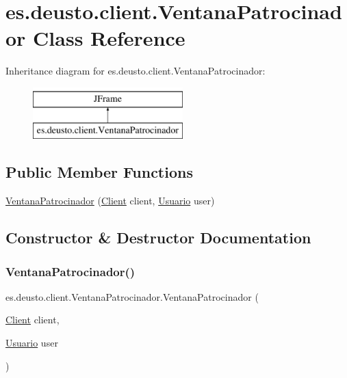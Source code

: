 \hypertarget{classes_1_1deusto_1_1client_1_1_ventana_patrocinador}{}\section{es.\+deusto.\+client.\+Ventana\+Patrocinador Class Reference}
\label{classes_1_1deusto_1_1client_1_1_ventana_patrocinador}
Inheritance diagram for es.\+deusto.\+client.\+Ventana\+Patrocinador\+:\begin{figure}[H]
\begin{center}
\leavevmode
\includegraphics[height=2.000000cm]{classes_1_1deusto_1_1client_1_1_ventana_patrocinador}
\end{center}
\end{figure}
\subsection*{Public Member Functions}
\begin{DoxyCompactItemize}
\item 
\mbox{\hyperlink{classes_1_1deusto_1_1client_1_1_ventana_patrocinador_a65d64a55d9a2790e06b115695738e04d}{Ventana\+Patrocinador}} (\mbox{\hyperlink{classes_1_1deusto_1_1client_1_1_client}{Client}} client, \mbox{\hyperlink{classes_1_1deusto_1_1server_1_1jdo_1_1_usuario}{Usuario}} user)
\end{DoxyCompactItemize}


\subsection{Constructor \& Destructor Documentation}
\mbox{\label{classes_1_1deusto_1_1client_1_1_ventana_patrocinador_a65d64a55d9a2790e06b115695738e04d}} 
\subsubsection{\texorpdfstring{VentanaPatrocinador()}{VentanaPatrocinador()}}
{\footnotesize\ttfamily es.\+deusto.\+client.\+Ventana\+Patrocinador.\+Ventana\+Patrocinador (\begin{DoxyParamCaption}\item[{\mbox{\hyperlink{classes_1_1deusto_1_1client_1_1_client}{Client}}}]{client,  }\item[{\mbox{\hyperlink{classes_1_1deusto_1_1server_1_1jdo_1_1_usuario}{Usuario}}}]{user }\end{DoxyParamCaption})}

